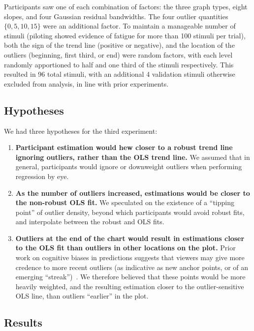 \documentclass{sigchi}
\begin{document}
Participants saw one of each combination of factors: the three graph types, eight slopes, and four Gaussian residual bandwidths. The four outlier quantities $\{0,5,10,15\}$ were an additional factor. To maintain a manageable number of stimuli (piloting showed evidence of fatigue for more than 100 stimuli per trial), both the sign of the trend line (positive or negative), and the location of the outliers (beginning, first third, or end) were random factors, with each level randomly apportioned to half and one third of the stimuli respectively. This resulted in 96 total stimuli, with an additional 4 validation stimuli otherwise excluded from analysis, in line with prior experiments.

\subsection{Hypotheses}

We had three hypotheses for the third experiment:
\begin{enumerate}
	\item \textbf{Participant estimation would hew closer to a robust trend line ignoring outliers, rather than the OLS trend line.} We assumed that in general, participants would ignore or downweight outliers when performing regression by eye.
	\item \textbf{As the number of outliers increased, estimations would be closer to the non-robust OLS fit.} We speculated on the existence of a ``tipping point'' of outlier density, beyond which participants would avoid robust fits, and interpolate between the robust and OLS fits.
	\item \textbf{Outliers at the end of the chart would result in estimations closer to the OLS fit than outliers in other locations on the plot.} Prior work on cognitive biases in predictions suggests that viewers may give more credence to more recent outliers (as indicative as new anchor points, or of an emerging ``streak'')~\cite{croson2005gambler}. We therefore believed that these points would be more heavily weighted, and the resulting estimation closer to the outlier-sensitive OLS line, than outliers ``earlier'' in the plot.
\end{enumerate}

\subsection{Results}

\expThreeErrorFig
\end{document}
